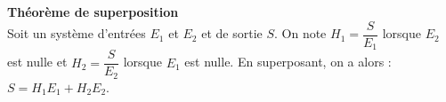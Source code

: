 %
%
%
%
%
%
%

\begin{defi} \textbf{\textsf{Théorème de superposition}}~\\
Soit un système d'entrées $E_1$ et $E_2$ et de sortie $S$. On note $H_1=\dfrac{S}{E_1}$ lorsque $E_2$ est nulle et $H_2=\dfrac{S}{E_2}$ lorsque $E_1$ est nulle. En superposant, on a alors : $S=H_1 E_1 + H_2 E_2$.
\end{defi}



